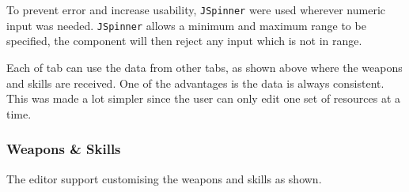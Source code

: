 To prevent error and increase usability,  \texttt{JSpinner} were used wherever numeric input was needed. \texttt{JSpinner} allows a minimum and maximum range to be specified,  the component will then reject any input which is not in range.

Each of tab can use the data from other tabs, as shown above where the weapons and skills are received. One of the advantages is the data is always consistent. This was made a lot simpler since the user can only edit one set of resources at a time.

\clearpage
\subsubsection{Weapons \& Skills}

The editor support customising the weapons and skills as shown. 

